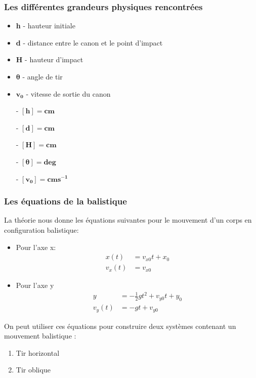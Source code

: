 \documentclass[12pt,a4paper]{article}
\begin{document}
    \subsubsection{Les différentes grandeurs physiques rencontrées}
    \begin{minipage}{0.6\linewidth}
        \begin{itemize}
            \item \textbf{h} - hauteur initiale 
            \item \textbf{d} - distance entre le canon et le point d'impact 
            \item \textbf{H} - hauteur d'impact
            \item $\bm{\theta}$ - angle de tir 
            \item $\bm{v_0}$ - vitesse de sortie du canon
        \end{itemize}
    \end{minipage}%
    \hfill
    \begin{minipage}{0.4\linewidth}
        \begin{itemize}
            \item[-] $\bm{[h]=cm}$
            \item[-] $\bm{[d]=cm}$
            \item[-] $\bm{[H]=cm}$
            \item[-] $\bm{[\theta]=deg}$
            \item[-] $\bm{[v_0]=cms^{-1}}$
        \end{itemize}   
    \end{minipage}
    \subsubsection{Les équations de la balistique}
    La théorie nous donne les équations suivantes pour le mouvement d'un corps en configuration balistique:
    \begin{itemize}
        \item Pour l'axe x:
        \begin{align*}
            x(t)&=v_{x0}t+x_0 \\
            v_x(t)&=v_{x0}
        \end{align*}
        \item Pour l'axe y
        \begin{align*}
            y&=-\frac{1}{2}gt^2+v_{y0}t+y_0 \\
            v_y(t)&=-gt+v_{y0}
        \end{align*}
    \end{itemize}
    On peut utiliser ces équations pour construire deux systèmes contenant un mouvement balistique :
    \begin{enumerate}
        \item Tir horizontal
        \item Tir oblique
    \end{enumerate}
\end{document}
